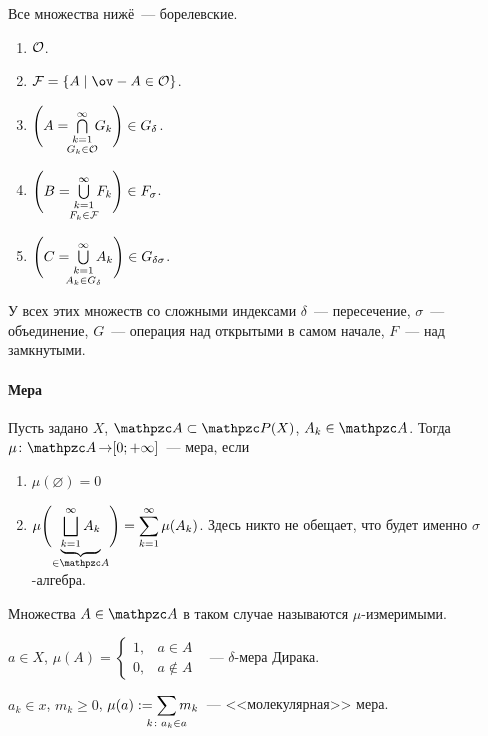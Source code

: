\documentclass[draft, timbord]{longnotes}
\begin{document}
\begin{exmp}\label{exmp:meas::setsys::borel}
  Все множества нижё~--- борелевские.
  \begin{enumerate}
    \item $\mathcal O $.
    \item $\closed =\{A \mid \ov-{A} \in \open \}$.
    \item $\Biggl(A 
      = \bigcap_{\substack{{k=1}\\[0.12em]\mathclap{ G_k \in \open}}}^\infty G_k \Biggr)\in G_\delta$.
    \item $\Biggl(B 
      = \bigcup_{\substack{{k=1}\\[0.12em]\mathclap{ F_k \in \closed}}}^\infty F_k \Biggr)\in
      F_\sigma$.
    \item $\Biggl(C 
      = \bigcup_{\substack{{k=1}\\[0.12em]\mathclap{ A_k \in G_{\delta}}}}^\infty A_k \Biggr)
      \in G_{\delta\sigma}$.
  \end{enumerate}
  У всех этих множеств со сложными индексами $\delta$~--- пересечение, $\sigma$~--- объединение,
  $G$~--- операция над открытыми в самом начале, $F$~--- над замкнутыми.
\end{exmp}

\paragraph{Мера}
\label{par:meas::meas}

\begin{defn}\label{defn:meas::meas}
  Пусть задано $X$, $\alg \subset \pset (X)$, $A_k \in \alg$. Тогда $\mu \colon \alg \to [0;
  +\infty]$~--- мера, если 
  \begin{enumerate}
    \item $\mu(\varnothing) = 0$
    \item $\displaystyle\mu\Biggl(\underbrace{\bigsqcup_{k=1}^\infty A_k}_{\in \alg}\Biggr)
      = \sum_{k=1}^\infty \mu(A_k)$. Здесь никто не обещает, что будет именно $\sigma$-алгебра.
  \end{enumerate}
  Множества $A \in \alg$ в таком случае называются $\mu$-измеримыми.
\end{defn}

\begin{exmp}\label{exmp:meas::meas::delta}
  $a \in X$, $\displaystyle\mu(A) = \begin{cases}
    1, & a\in A \\
    0, & a \not\in A
  \end{cases}$ ~--- $\delta$-мера Дирака.
\end{exmp}
\begin{exmp}\label{exmp:meas::meas::mol}
  $a_k \in x$, $m_k \geqslant 0$, $\displaystyle\mu(a) 
  := \sum_{\mathclap {k\colon a_k \in a}} m_k$~---
  <<молекулярная>> мера.
\end{exmp}
\end{document}
